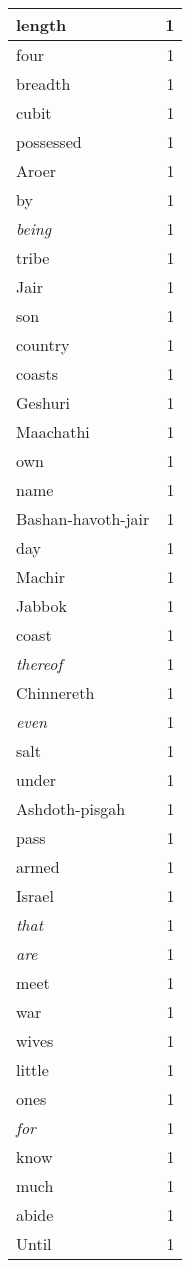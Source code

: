 \begin{center}
\begin{longtable}{l|r}
length & 1 \\ \hline
four & 1 \\ \hline
breadth & 1 \\ \hline
cubit & 1 \\ \hline
possessed & 1 \\ \hline
Aroer & 1 \\ \hline
by & 1 \\ \hline
\emph{being} & 1 \\ \hline
tribe & 1 \\ \hline
Jair & 1 \\ \hline
son & 1 \\ \hline
country & 1 \\ \hline
coasts & 1 \\ \hline
Geshuri & 1 \\ \hline
Maachathi & 1 \\ \hline
own & 1 \\ \hline
name & 1 \\ \hline
Bashan-havoth-jair & 1 \\ \hline
day & 1 \\ \hline
Machir & 1 \\ \hline
Jabbok & 1 \\ \hline
coast & 1 \\ \hline
\emph{thereof} & 1 \\ \hline
Chinnereth & 1 \\ \hline
\emph{even} & 1 \\ \hline
salt & 1 \\ \hline
under & 1 \\ \hline
Ashdoth-pisgah & 1 \\ \hline
pass & 1 \\ \hline
armed & 1 \\ \hline
Israel & 1 \\ \hline
\emph{that} & 1 \\ \hline
\emph{are} & 1 \\ \hline
meet & 1 \\ \hline
war & 1 \\ \hline
wives & 1 \\ \hline
little & 1 \\ \hline
ones & 1 \\ \hline
\emph{for} & 1 \\ \hline
know & 1 \\ \hline
much & 1 \\ \hline
abide & 1 \\ \hline
Until & 1 \\ \hline

\end{longtable}
\end{center}
